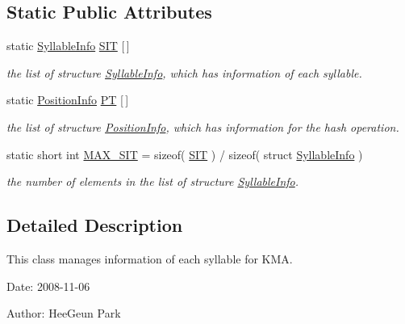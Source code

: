 \subsection*{Static Public Attributes}
\begin{CompactItemize}
\item 
static \hyperlink{structkmaOrange_1_1SyllableInfo}{SyllableInfo} \hyperlink{classkmaOrange_1_1ExCP949_c314ba60fe83622b74f43e1b1611b2ae}{SIT} \mbox{[}$\,$\mbox{]}
\begin{CompactList}\small\item\em the list of structure \hyperlink{structkmaOrange_1_1SyllableInfo}{SyllableInfo}, which has information of each syllable. \item\end{CompactList}\item 
static \hyperlink{structkmaOrange_1_1PositionInfo}{PositionInfo} \hyperlink{classkmaOrange_1_1ExCP949_64c74c62aff0c87c7bbdf5bc270c2024}{PT} \mbox{[}$\,$\mbox{]}
\begin{CompactList}\small\item\em the list of structure \hyperlink{structkmaOrange_1_1PositionInfo}{PositionInfo}, which has information for the hash operation. \item\end{CompactList}\item 
static short int \hyperlink{classkmaOrange_1_1ExCP949_2bfe3d86204e992f440de9770e8aeec6}{MAX\_\-SIT} = sizeof( \hyperlink{classkmaOrange_1_1ExCP949_c314ba60fe83622b74f43e1b1611b2ae}{SIT} ) / sizeof( struct \hyperlink{structkmaOrange_1_1SyllableInfo}{SyllableInfo} )
\begin{CompactList}\small\item\em the number of elements in the list of structure \hyperlink{structkmaOrange_1_1SyllableInfo}{SyllableInfo}. \item\end{CompactList}\end{CompactItemize}


\subsection{Detailed Description}
This class manages information of each syllable for KMA. 

\begin{Desc}
\item[Date:]2008-11-06 \end{Desc}
\begin{Desc}
\item[Author:]HeeGeun Park \end{Desc}


